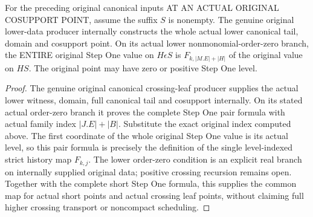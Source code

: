 \begin{theorem}
\label{hir:original-crossing-leaf-common-history-map}
\leanok
For the preceding original canonical inputs AT AN ACTUAL ORIGINAL COSUPPORT
POINT, assume the suffix $S$ is nonempty.
The genuine original lower-data producer internally constructs the whole
actual lower canonical tail, domain and cosupport point. On its actual lower
nonmonomial-order-zero branch, the ENTIRE original Step One value on
$H\epsilon S$ is $F_{k,|M.E|+|H|}$ of the original value on $HS$.
The original point may have zero or positive Step One level.
\end{theorem}
\begin{proof}
The genuine original canonical crossing-leaf producer supplies the actual
lower witness, domain, full canonical tail and cosupport internally. On its
stated actual order-zero branch it proves the complete Step One pair formula
with actual family index $|J.E|+|B|$. Substitute the exact original index
computed above. The first coordinate of the whole original Step One value
is its actual level, so this pair formula is precisely the definition of the
single level-indexed strict history map $F_{k,j}$. The lower order-zero
condition is an explicit real branch on internally supplied original data;
positive crossing recursion remains open. Together with the complete short
Step One formula, this supplies the common map for actual short points and
actual crossing leaf points, without claiming full higher crossing transport
or noncompact scheduling.
\end{proof}
